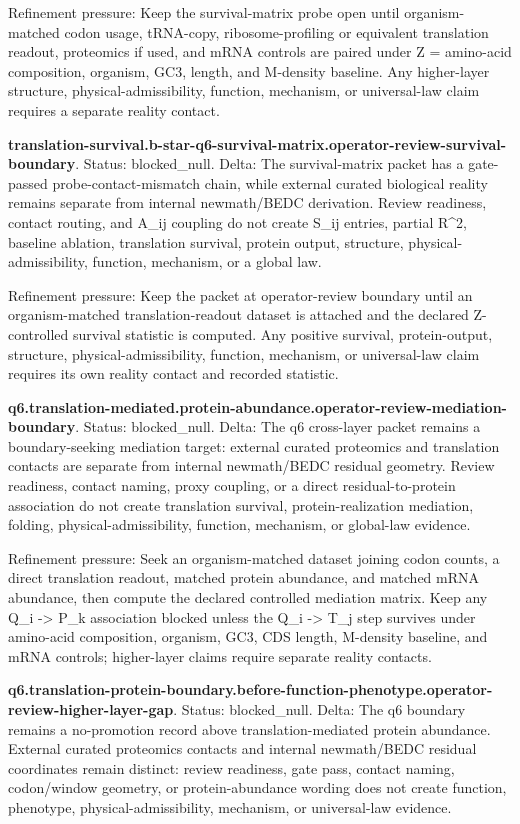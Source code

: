 Refinement pressure: Keep the survival-matrix probe open until organism-matched codon usage, tRNA-copy, ribosome-profiling or equivalent translation readout, proteomics if used, and mRNA controls are paired under Z = amino-acid composition, organism, GC3, length, and M-density baseline. Any higher-layer structure, physical-admissibility, function, mechanism, or universal-law claim requires a separate reality contact.

\textbf{translation-survival.b-star-q6-survival-matrix.operator-review-survival-boundary}. Status: blocked\_null. Delta: The survival-matrix packet has a gate-passed probe-contact-mismatch chain, while external curated biological reality remains separate from internal newmath/BEDC derivation. Review readiness, contact routing, and A\_ij coupling do not create S\_ij entries, partial R\textasciicircum{}2, baseline ablation, translation survival, protein output, structure, physical-admissibility, function, mechanism, or a global law.

Refinement pressure: Keep the packet at operator-review boundary until an organism-matched translation-readout dataset is attached and the declared Z-controlled survival statistic is computed. Any positive survival, protein-output, structure, physical-admissibility, function, mechanism, or universal-law claim requires its own reality contact and recorded statistic.

\textbf{q6.translation-mediated.protein-abundance.operator-review-mediation-boundary}. Status: blocked\_null. Delta: The q6 cross-layer packet remains a boundary-seeking mediation target: external curated proteomics and translation contacts are separate from internal newmath/BEDC residual geometry. Review readiness, contact naming, proxy coupling, or a direct residual-to-protein association do not create translation survival, protein-realization mediation, folding, physical-admissibility, function, mechanism, or global-law evidence.

Refinement pressure: Seek an organism-matched dataset joining codon counts, a direct translation readout, matched protein abundance, and matched mRNA abundance, then compute the declared controlled mediation matrix. Keep any Q\_i -> P\_k association blocked unless the Q\_i -> T\_j step survives under amino-acid composition, organism, GC3, CDS length, M-density baseline, and mRNA controls; higher-layer claims require separate reality contacts.

\textbf{q6.translation-protein-boundary.before-function-phenotype.operator-review-higher-layer-gap}. Status: blocked\_null. Delta: The q6 boundary remains a no-promotion record above translation-mediated protein abundance. External curated proteomics contacts and internal newmath/BEDC residual coordinates remain distinct: review readiness, gate pass, contact naming, codon/window geometry, or protein-abundance wording does not create function, phenotype, physical-admissibility, mechanism, or universal-law evidence.

